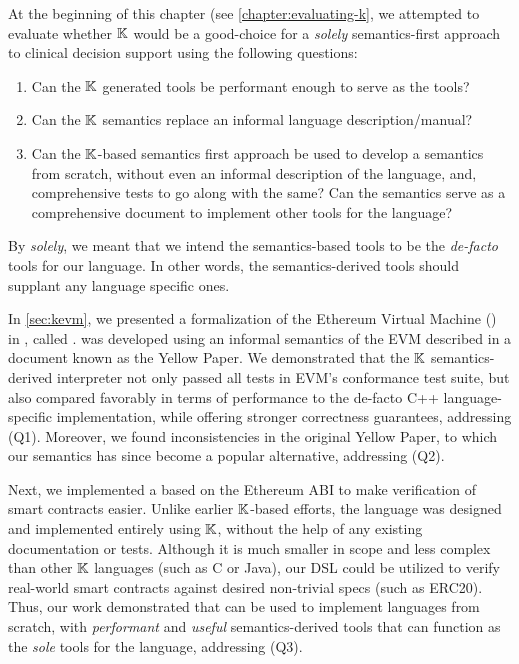 At the beginning of this chapter (see \autoref{chapter:evaluating-k},
we attempted to evaluate whether $\mathbb{K}$ would be a good-choice for
a \emph{solely} semantics-first approach to clinical decision support using the following
questions:
\begin{enumerate}[label=(Q\arabic*)]
 \item Can the $\mathbb{K}$ generated tools be performant enough to serve as
 the  tools?
 \item Can the $\mathbb{K}$ semantics replace an informal language description/manual?
 \item Can the $\mathbb{K}$-based semantics first approach be used to develop
 a semantics from scratch, without even an informal description of the language,
  and, comprehensive tests to go along with the same? Can the semantics
  serve as a comprehensive document to implement other tools for the language?
\end{enumerate}
By \emph{solely}, we meant that we intend the semantics-based tools to be
the \emph{de-facto} tools for our language. In other words, the
semantics-derived tools should supplant any language specific ones.

In \autoref{sec:kevm}, we presented a formalization of the
Ethereum Virtual Machine (\EVM{}) in \K{}, called \KEVM{}.
\KEVM{} was developed using an informal semantics of
the EVM described in a document known as the Yellow Paper.
We demonstrated that the $\mathbb{K}{}$ semantics-derived
interpreter not only passed all tests in EVM's conformance test suite,
but also compared favorably in terms of performance to the de-facto
C++ language-specific implementation, while offering stronger correctness
guarantees, addressing (Q1). Moreover, we found inconsistencies
in the original Yellow Paper, to which our semantics has since become a popular
alternative, addressing (Q2).

Next, we implemented a \DSL{} based on the Ethereum ABI to make verification of
smart contracts easier. Unlike earlier $\mathbb{K}$-based efforts, the language was
designed and implemented entirely using $\mathbb{K}$, without the help of any
existing documentation or tests. Although it is much smaller in scope and
less complex than other $\mathbb{K}$ languages (such as C or Java), our DSL could be
utilized to verify real-world smart contracts against desired non-trivial specs
(such as ERC20). Thus, our work demonstrated that \K{} can be used to implement
languages from scratch, with \emph{performant} and \emph{useful}
semantics-derived tools that can function as the \emph{sole} tools for the
language, addressing (Q3).

